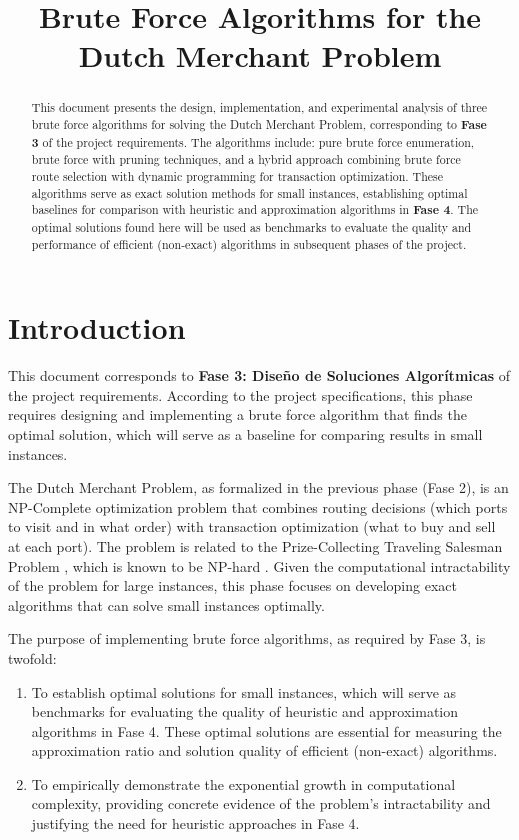 \documentclass[12pt]{article}
\title{Brute Force Algorithms for the Dutch Merchant Problem}
\author{}
\date{}
\begin{document}
\maketitle

\begin{abstract}
This document presents the design, implementation, and experimental analysis of three brute force algorithms for solving the Dutch Merchant Problem, corresponding to \textbf{Fase 3} of the project requirements. The algorithms include: pure brute force enumeration, brute force with pruning techniques, and a hybrid approach combining brute force route selection with dynamic programming for transaction optimization. These algorithms serve as exact solution methods for small instances, establishing optimal baselines for comparison with heuristic and approximation algorithms in \textbf{Fase 4}. The optimal solutions found here will be used as benchmarks to evaluate the quality and performance of efficient (non-exact) algorithms in subsequent phases of the project.
\end{abstract}

\section{Introduction}
\label{sec:introduction}

This document corresponds to \textbf{Fase 3: Diseño de Soluciones Algorítmicas} of the project requirements. According to the project specifications, this phase requires designing and implementing a brute force algorithm that finds the optimal solution, which will serve as a baseline for comparing results in small instances.

The Dutch Merchant Problem, as formalized in the previous phase (Fase 2), is an NP-Complete optimization problem \cite{garey1979} that combines routing decisions (which ports to visit and in what order) with transaction optimization (what to buy and sell at each port). The problem is related to the Prize-Collecting Traveling Salesman Problem \cite{MarchettiSpaccamela2007PrizeCollectingTS}, which is known to be NP-hard \cite{karp1972}. Given the computational intractability of the problem for large instances, this phase focuses on developing exact algorithms that can solve small instances optimally.

The purpose of implementing brute force algorithms, as required by Fase 3, is twofold:
\begin{enumerate}
    \item To establish optimal solutions for small instances, which will serve as benchmarks for evaluating the quality of heuristic and approximation algorithms in Fase 4. These optimal solutions are essential for measuring the approximation ratio and solution quality of efficient (non-exact) algorithms.
    \item To empirically demonstrate the exponential growth in computational complexity, providing concrete evidence of the problem's intractability and justifying the need for heuristic approaches in Fase 4.
\end{enumerate}
\end{document}
